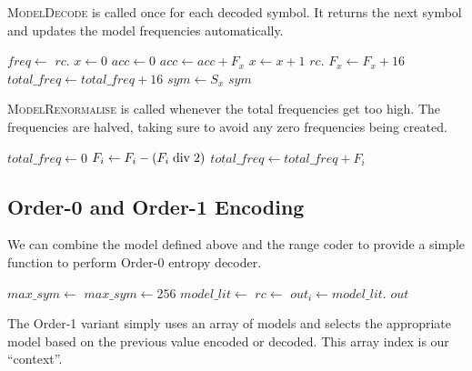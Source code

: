 \documentclass[a4paper]{article}
\begin{document}
\textsc{ModelDecode} is called once for each decoded symbol.
It returns the next symbol and updates the model frequencies automatically.

\begin{algorithmic}[1]
  \State $freq \gets$ $rc.$
  \State $x \gets 0$
  \State $acc \gets 0$
    \State $acc \gets acc + F_x$
    \State $x \gets x+1$
  \EndWhile
  \State $rc.$
  \State $F_x \gets F_x + 16$ 
  \State $total\_freq \gets total\_freq + 16$
    \State {}
  \EndIf
  \State $sym \gets S_x$
    \State {}
    \State {}
  \EndIf
  \State \Return $sym$
\EndFunction
\end{algorithmic}

\textsc{ModelRenormalise} is called whenever the total frequencies get too high.
The frequencies are halved, taking sure to avoid any zero frequencies being created.

\begin{algorithmic}[1]
  \State $total\_freq \gets 0$
    \State $F_i \gets F_i - (F_i \bdiv 2)$
    \State $total\_freq \gets total\_freq + F_i$
  \EndFor
\EndProcedure
\end{algorithmic}

\subsection{Order-0 and Order-1 Encoding}

We can combine the model defined above and the range coder to provide a simple function to perform Order-0 entropy decoder.

\begin{algorithmic}[1]
  \State $max\_sym \gets $
    \State $max\_sym \gets 256$
  \EndIf
  \State $model\_lit \gets $
  \Statex
  \State $rc \gets $
    \State $out_i \gets model\_lit.$
  \EndFor
  \State \Return $out$
\EndFunction
\end{algorithmic}

The Order-1 variant simply uses an array of models and selects the appropriate model based on the previous value encoded or decoded.
This array index is our ``context''.
\end{document}
